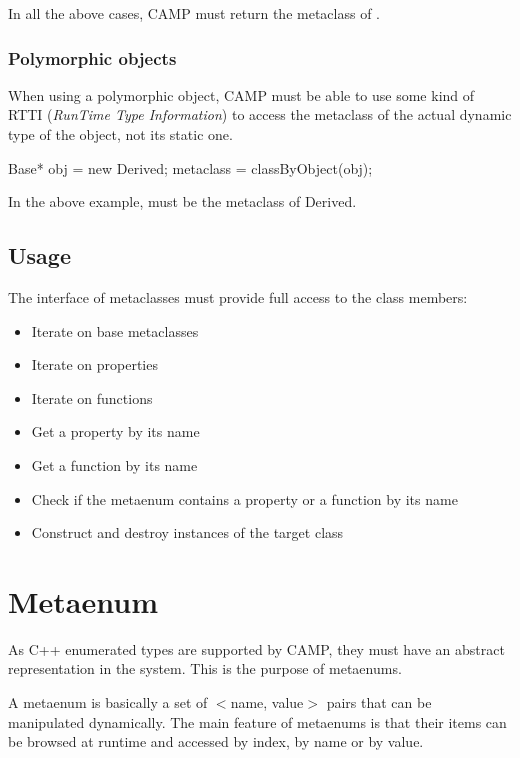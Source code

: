 \documentclass[a4paper, twoside]{report}
\begin{document}
	In all the above cases, CAMP must return the metaclass of \verb@T@.

\subsubsection{Polymorphic objects}

	When using a polymorphic object, CAMP must be able to use some kind of
	RTTI (\emph{RunTime Type Information}) to access the metaclass of the actual
	dynamic type of the object, not its static one.
	
\begin{cppcode}
Base* obj = new Derived;
metaclass = classByObject(obj);
\end{cppcode}
	
	In the above example, \verb@metaclass@ must be the metaclass of Derived.

\subsection{Usage}

	The interface of metaclasses must provide full access to the class members:
	
	\begin{itemize}
		\item Iterate on base metaclasses
		\item Iterate on properties
		\item Iterate on functions
		\item Get a property by its name
		\item Get a function by its name
		\item Check if the metaenum contains a property or a function by its name
		\item Construct and destroy instances of the target class
	\end{itemize}

\section{Metaenum}
\label{sec:metaenum}

	As C++ enumerated types are supported by CAMP, they must have an abstract representation in the system.
	This is the purpose of metaenums.
	
	A metaenum is basically a set of $<$name, value$>$ pairs that can be manipulated dynamically.
	The main feature of metaenums is that their items can be browsed at runtime and accessed by index,
	by name or by value.
\end{document}
